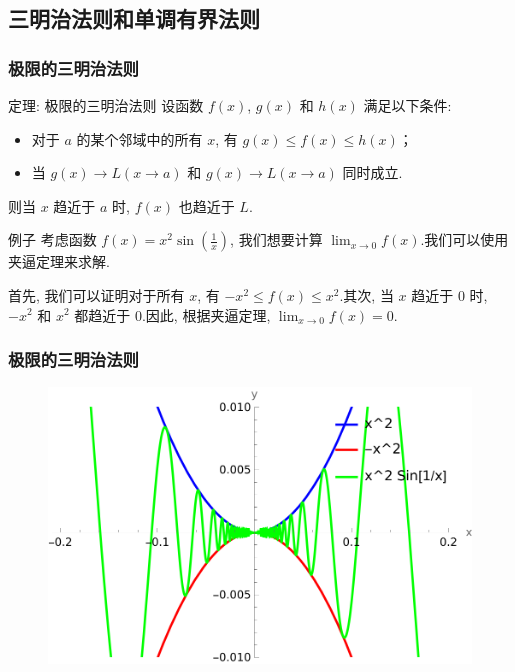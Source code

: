 \documentclass[
10pt,  
aspectratio=43,  
]{beamer}
\begin{document}
\subsection{三明治法则和单调有界法则}

\begin{frame}
\frametitle{极限的三明治法则}

\begin{block}{定理: 极限的三明治法则}
设函数 $f(x)$,   $g(x)$ 和 $h(x)$ 满足以下条件: 
\begin{itemize}
  \item 对于 $a$ 的某个邻域中的所有 $x$,  有 $g(x) \leq f(x) \leq h(x)$；
  \item 当 $g(x)\to L$$(x\to a)$ 和 $g(x)\to L$$(x\to a)$ 同时成立.
\end{itemize}
则当 $x$ 趋近于 $a$ 时,  $f(x)$ 也趋近于 $L$.
\end{block}

\begin{exampleblock}{例子}
考虑函数 $f(x) = x^2 \sin\left(\frac{1}{x}\right)$,  我们想要计算 $\lim_{x \to 0} f(x)$.我们可以使用夹逼定理来求解.

首先,  我们可以证明对于所有 $x$,  有 $-x^2 \leq f(x) \leq x^2$.其次,  当 $x$ 趋近于 $0$ 时,  $-x^2$ 和 $x^2$ 都趋近于 $0$.因此,  根据夹逼定理,  $\lim_{x \to 0} f(x) = 0$.
\end{exampleblock}

\end{frame}

\begin{frame}
\frametitle{极限的三明治法则}

\begin{figure}
    \centering
    \includegraphics[width=1\linewidth]{sandwich.png}


\end{figure}
\end{frame}
\end{document}

